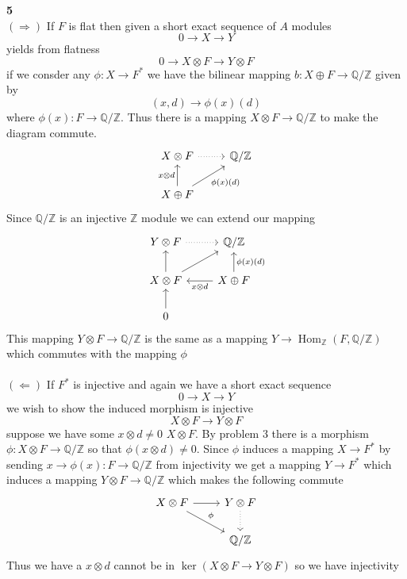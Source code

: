 \documentclass[12pt]{article}
\newenvironment{ques}[1]{\textbf{#1}\vspace{1 mm}\\ }{\bigskip}
\theoremstyle{definition}
\DeclareMathOperator\Hom{Hom}
\newcommand{\Q}{\mathbb Q}
\newcommand{\Z}{\mathbb Z}
\newcommand{\tensor}{\otimes}
\begin{document}
\begin{ques}{5}
	$(\Rightarrow)$ If $F$ is flat then given a short exact sequence of $A$ modules
	$$0 \to X \to Y$$
	yields from flatness
	$$0 \to X \tensor F \to Y \tensor F$$
	if we consder any $\phi :X \to F^*$ we have the bilinear mapping $b: X \oplus
	F \to \Q/\Z$ given by
	$$(x,d) \to \phi(x) (d)$$
	where $\phi(x):F \to \Q/\Z$. Thus there is a mapping $X \tensor F \to
	\Q/\Z$ to make the diagram commute.
	$$\begin{tikzcd}
	X \tensor F \arrow[r, dotted] & \Q/\Z\\
	X \oplus F \arrow[ur, "\phi(x)(d)"'] \arrow[u, "x \tensor d"] & 
	\end{tikzcd}$$
	Since $\Q/\Z$ is an injective $\Z$ module we can extend our mapping
	$$\begin{tikzcd}
	Y \tensor F \arrow[r, dotted] & \Q/\Z\\
	X \tensor F \arrow[ur] \arrow[u] & X \oplus F \arrow[l, "x \tensor d"]
	\arrow[u, "\phi(x)(d)"']\\
	0 \arrow[u] & 
	\end{tikzcd}$$
	This mapping $Y \tensor F \to \Q/\Z$ is the same as a mapping $Y \to
	\Hom_\Z(F, \Q/\Z)$ which commutes with the mapping $\phi$\\
	\\
	$(\Leftarrow)$ If $F^*$ is injective and again we have a short exact sequence
	$$0 \to X \to Y$$
	we wish to show the induced morphism is injective
	$$X \tensor F \to Y \tensor F$$
	suppose we have some $x \tensor d \neq 0$ $X \tensor F$. By problem 3 there
	is a morphism $\phi:X \tensor F \to \Q/\Z$ so that
	$\phi(x \tensor d) \neq 0$. Since $\phi$ induces a mapping $X \to F^*$ by
	sending $x \to \phi(x):F \to \Q/\Z$ from injectivity we get a mapping $Y
	\to F^*$ which induces a mapping $Y \tensor F \to \Q/\Z$ which makes the
	following commute
	$$\begin{tikzcd}
	X \tensor F \arrow[dr, "\phi"] \arrow[r] & Y \tensor F \arrow[d, dotted]\\
	& \Q/\Z 
	\end{tikzcd}$$
	Thus we have a $x \tensor d$ cannot be in $\ker(X \tensor F \to Y \tensor
	F)$ so we have injectivity
\end{ques}
\end{document}
